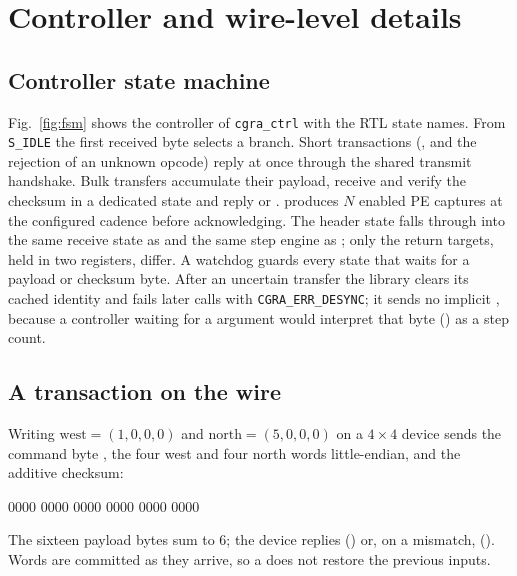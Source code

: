 \section{Controller and wire-level details}

\subsection{Controller state machine}
Fig.~\ref{fig:fsm} shows the controller of \texttt{cgra\_ctrl} with the RTL
state names. From \texttt{S\_IDLE} the first received byte selects a branch.
Short transactions (,  and the rejection of an unknown
opcode) reply at once through the shared transmit handshake. Bulk transfers
accumulate their payload, receive and verify the checksum in a dedicated
state and reply  or .  produces $N$ enabled PE
captures at the configured cadence before acknowledging. The 
header state falls through into the same receive state as  and the
same step engine as ; only the return targets, held in two
registers, differ. A watchdog guards every state that waits for a payload
or checksum byte. After an uncertain transfer the library clears its cached
identity and fails later calls with \texttt{CGRA\_ERR\_DESYNC}; it sends no
implicit , because a controller waiting for a  argument
would interpret that byte () as a step count.



\subsection{A transaction on the wire}
Writing $\text{west}=(1,0,0,0)$ and $\text{north}=(5,0,0,0)$ on a $4\times4$
device sends the command byte , the four west and four north words
little-endian, and the additive checksum:
\begin{center}\small{} 0000 0000 0000 0000 0000 0000
\end{center}
The sixteen payload bytes sum to 6; the device replies 
() or, on a mismatch,  (). Words are committed
as they arrive, so a  does not restore the previous inputs.
